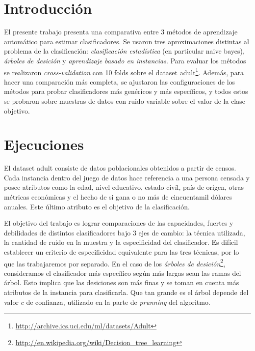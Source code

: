 \documentclass[a4paper,10pt]{article}
\begin{document}



\maketitle
\tableofcontents
\newpage

\section{Introducción}

El presente trabajo presenta una comparativa entre 3 métodos de aprendizaje automático para estimar clasificadores. Se usaron tres aproximaciones distintas al problema de la clasificación: \emph{clasificación estadística} (en particular \textsf{naive bayes}), \emph{árboles de desición} y \emph{aprendizaje basado en instancias}. Para evaluar los métodos se realizaron \emph{cross-validation} con 10 folds sobre el dataset \textsf{adult}\footnote{\url{http://archive.ics.uci.edu/ml/datasets/Adult}}. Además, para hacer una comparación más completa, se ajustaron las configuraciones de los métodos para probar clasificadores más genéricos y más específicos, y todos estos se probaron sobre muestras de datos con ruido variable sobre el valor de la clase objetivo. 

\section{Ejecuciones}

El dataset \textsf{adult} consiste de datos poblacionales obtenidos a partir de censos. Cada instancia dentro del juego de datos hace referencia a una persona censada y posee atributos como la edad, nivel educativo, estado civíl, país de origen, otras métricas económicas y el hecho de si gana o no más de cincuentamil dólares anuales. Este último atributo es el objetivo de la clasificación.

El objetivo del trabajo es lograr comparaciones de las capacidades, fuertes y debilidades de distintos clasificadores bajo 3 ejes de cambio: la técnica utilizada, la cantidad de ruido en la muestra y la especificidad del clasificador. Es difícil establecer un criterio de especificidad equivalente para las tres técnicas, por lo que las trabajaremos por separado. En el caso de los \emph{árboles de desición}\footnote{\url{http://en.wikipedia.org/wiki/Decision\_tree\_learning}}, consideramos el clasificador más específico según más largas sean las ramas del árbol. Esto implica que las desiciones son más finas y se toman en cuenta más atributos de la instancia para clasificarla. Que tan grande es el árbol depende del valor $c$ de confianza, utilizado en la parte de \emph{prunning} del algoritmo.
\end{document}

